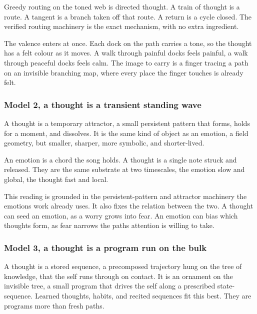 \begin{proposition}
Greedy routing on the toned web is directed thought. A train of thought is a route. A tangent is a branch taken off that route. A return is a cycle closed. The verified routing machinery is the exact mechanism, with no extra ingredient.
\end{proposition}

The valence enters at once. Each dock on the path carries a tone, so the thought has a felt colour as it moves. A walk through painful docks feels painful, a walk through peaceful docks feels calm. The image to carry is a finger tracing a path on an invisible branching map, where every place the finger touches is already felt.

\subsubsection{Model 2, a thought is a transient standing wave}

A thought is a temporary attractor, a small persistent pattern that forms, holds for a moment, and dissolves. It is the same kind of object as an emotion, a field geometry, but smaller, sharper, more symbolic, and shorter-lived.

\begin{result}
An emotion is a chord the song holds. A thought is a single note struck and released. They are the same substrate at two timescales, the emotion slow and global, the thought fast and local.
\end{result}

This reading is grounded in the persistent-pattern and attractor machinery the emotions work already uses. It also fixes the relation between the two. A thought can seed an emotion, as a worry grows into fear. An emotion can bias which thoughts form, as fear narrows the paths attention is willing to take.

\subsubsection{Model 3, a thought is a program run on the bulk}

A thought is a stored sequence, a precomposed trajectory hung on the tree of knowledge, that the self runs through on contact. It is an ornament on the invisible tree, a small program that drives the self along a prescribed state-sequence. Learned thoughts, habits, and recited sequences fit this best. They are programs more than fresh paths.

